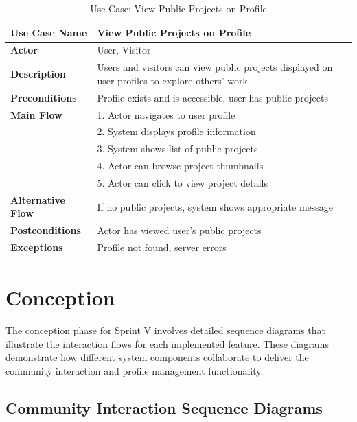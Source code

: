 \begin{table}[H]
\centering
\caption{Use Case: View Public Projects on Profile}
\begin{tabular}{|p{3cm}|p{10cm}|}
\hline
\textbf{Use Case Name} & View Public Projects on Profile \\
\hline
\textbf{Actor} & User, Visitor \\
\hline
\textbf{Description} & Users and visitors can view public projects displayed on user profiles to explore others' work \\
\hline
\textbf{Preconditions} & Profile exists and is accessible, user has public projects \\
\hline
\textbf{Main Flow} & 
1. Actor navigates to user profile \\
& 2. System displays profile information \\
& 3. System shows list of public projects \\
& 4. Actor can browse project thumbnails \\
& 5. Actor can click to view project details \\
\hline
\textbf{Alternative Flow} & If no public projects, system shows appropriate message \\
\hline
\textbf{Postconditions} & Actor has viewed user's public projects \\
\hline
\textbf{Exceptions} & Profile not found, server errors \\
\hline
\end{tabular}
\end{table}

\section{Conception}

The conception phase for Sprint V involves detailed sequence diagrams that illustrate the interaction flows for each implemented feature. These diagrams demonstrate how different system components collaborate to deliver the community interaction and profile management functionality.

\subsection{Community Interaction Sequence Diagrams}

